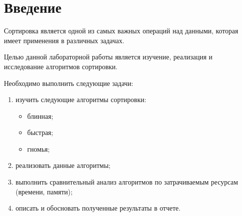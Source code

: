 \chapter*{Введение}

Сортировка является одной из самых важных операций над данными, которая имеет применения в различных задачах.

Целью данной лабораторной работы является изучение, реализация и исследование алгоритмов сортировки.

Необходимо выполнить следующие задачи:
\begin{enumerate}[]
    \item изучить следующие алгоритмы сортировки:
    \begin{itemize}
        \item блинная;
        \item быстрая;
        \item гномья;
    \end{itemize}
    \item реализовать данные алгоритмы;
    \item выполнить сравнительный анализ алгоритмов по затрачиваемым ресурсам (времени, памяти);
    \item описать и обосновать полученные результаты в отчете.
\end{enumerate}